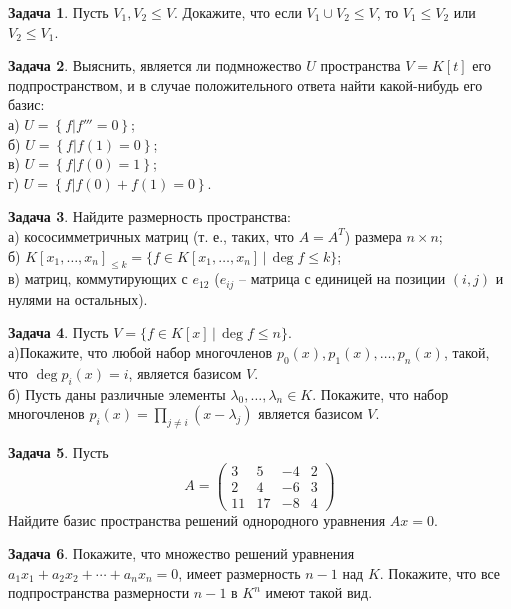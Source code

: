 \documentclass[12pt, fleqn]{extarticle}
\theoremstyle{definition}
\newtheorem{problem}{Задача}
\theoremstyle{remark}
\begin{document}
\begin{problem}
Пусть $V_1,V_2\leq V$. 
Докажите, что если $V_1\cup V_2\leq V$, то $V_1\leq V_2$ или $V_2\leq V_1$.
\end{problem}


\begin{problem}
Выяснить, является ли подмножество $U$ пространства $V = K[t]$
его подпространством, и в случае положительного ответа найти
какой-нибудь его базис:\\
а) $U = \left\{f \vert f''' = 0 \right\}$;\\
б) $U = \left\{f \vert f(1) = 0 \right\}$;\\
в) $U = \left\{f \vert f(0) = 1 \right\}$;\\
г) $U = \left\{f \vert f(0) + f(1) = 0 \right\}$.
\end{problem}


\begin{problem}
Найдите размерность пространства:\\
а) кососимметричных матриц (т. е., таких, что $A = A^{T}$) размера $n\times n$;\\
б) $K[x_1,\dots,x_n]_{\leq k}=\{ f \in K[x_1,\dots,x_n]\,|\, \deg f\leq k\}$;\\
в) матриц, коммутирующих с $e_{12}$ 
($e_{ij}$ -- матрица с единицей на позиции $(i, j)$ и нулями на остальных).
\end{problem}

\begin{problem}
Пусть $V=\{f\in K[x]\,|\, \deg f\leq n\}$. \\
а)Покажите, что любой набор многочленов $p_0(x), p_1(x), \dots, p_n(x)$, 
такой, что $\deg p_i(x)=i$, является базисом $V$.\\
б) Пусть даны различные элементы $\lambda_0, \dots, \lambda_n\in K$. 
Покажите, что набор многочленов $p_i(x)=\prod_{j\neq i}(x-\lambda_j)$ является базисом $V$.
\end{problem}


\begin{problem}
Пусть 
$$A=\left(\begin{matrix}
3& 5&-4& 2 \\
2& 4&-6& 3 \\
11& 17& -8& 4 
\end{matrix}\right)$$
Найдите базис пространства решений однородного уравнения $Ax=0$.
\end{problem}

\begin{problem}
Покажите, что множество решений уравнения $a_1x_1+a_2x_2+\cdots+a_nx_n=0$, имеет размерность $n-1$ над $K$. Покажите, что все подпространства размерности $n-1$ в $K^n$ имеют такой вид.
\end{problem}
\end{document}

